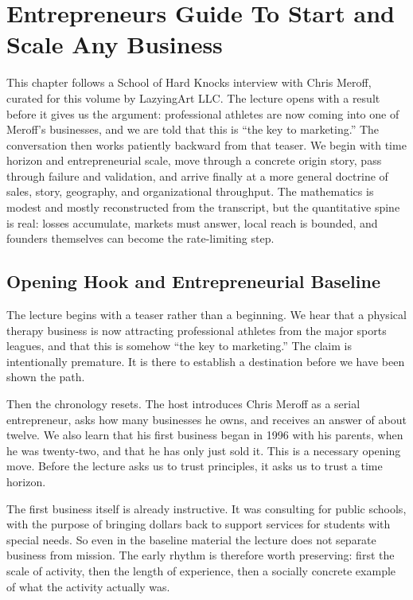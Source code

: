 \chapter{Entrepreneurs Guide To Start and Scale Any Business}

This chapter follows a School of Hard Knocks interview with Chris Meroff, curated for this volume by LazyingArt LLC. The lecture opens with a result before it gives us the argument: professional athletes are now coming into one of Meroff's businesses, and we are told that this is ``the key to marketing.'' The conversation then works patiently backward from that teaser. We begin with time horizon and entrepreneurial scale, move through a concrete origin story, pass through failure and validation, and arrive finally at a more general doctrine of sales, story, geography, and organizational throughput. The mathematics is modest and mostly reconstructed from the transcript, but the quantitative spine is real: losses accumulate, markets must answer, local reach is bounded, and founders themselves can become the rate-limiting step.

\section{Opening Hook and Entrepreneurial Baseline}

The lecture begins with a teaser rather than a beginning. We hear that a physical therapy business is now attracting professional athletes from the major sports leagues, and that this is somehow ``the key to marketing.'' The claim is intentionally premature. It is there to establish a destination before we have been shown the path.

Then the chronology resets. The host introduces Chris Meroff as a serial entrepreneur, asks how many businesses he owns, and receives an answer of about twelve. We also learn that his first business began in 1996 with his parents, when he was twenty-two, and that he has only just sold it. This is a necessary opening move. Before the lecture asks us to trust principles, it asks us to trust a time horizon.

The first business itself is already instructive. It was consulting for public schools, with the purpose of bringing dollars back to support services for students with special needs. So even in the baseline material the lecture does not separate business from mission. The early rhythm is therefore worth preserving: first the scale of activity, then the length of experience, then a socially concrete example of what the activity actually was.

